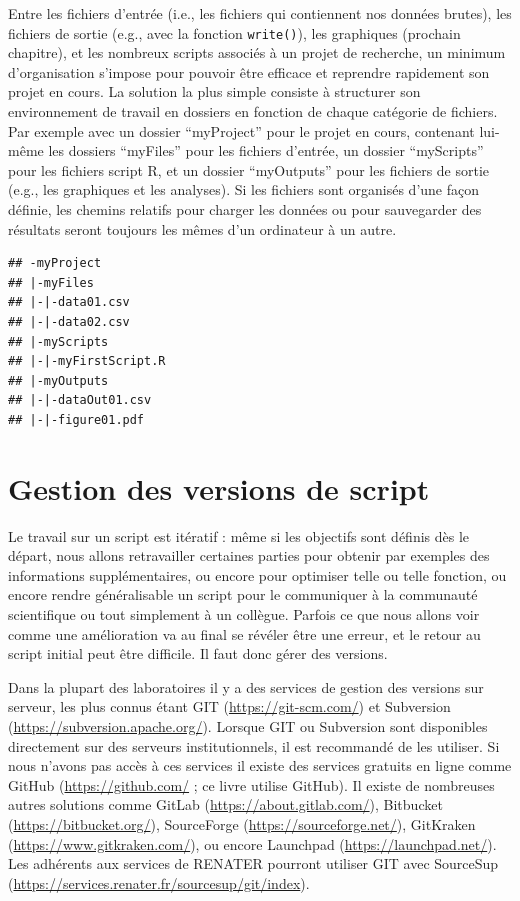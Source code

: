 \documentclass[twoside,symmetric]{book}
\begin{document}
Entre les fichiers d'entrée (i.e., les fichiers qui contiennent nos données brutes), les fichiers de sortie (e.g., avec la fonction \texttt{write()}), les graphiques (prochain chapitre), et les nombreux scripts associés à un projet de recherche, un minimum d'organisation s'impose pour pouvoir être efficace et reprendre rapidement son projet en cours. La solution la plus simple consiste à structurer son environnement de travail en dossiers en fonction de chaque catégorie de fichiers. Par exemple avec un dossier ``myProject'' pour le projet en cours, contenant lui-même les dossiers ``myFiles'' pour les fichiers d'entrée, un dossier ``myScripts'' pour les fichiers script R, et un dossier ``myOutputs'' pour les fichiers de sortie (e.g., les graphiques et les analyses). Si les fichiers sont organisés d'une façon définie, les chemins relatifs pour charger les données ou pour sauvegarder des résultats seront toujours les mêmes d'un ordinateur à un autre.

\begin{verbatim}
## -myProject
## |-myFiles
## |-|-data01.csv
## |-|-data02.csv
## |-myScripts
## |-|-myFirstScript.R
## |-myOutputs
## |-|-dataOut01.csv
## |-|-figure01.pdf
\end{verbatim}

\hypertarget{gestion-des-versions-de-script}{%
\section{Gestion des versions de script}\label{gestion-des-versions-de-script}}

Le travail sur un script est itératif : même si les objectifs sont définis dès le départ, nous allons retravailler certaines parties pour obtenir par exemples des informations supplémentaires, ou encore pour optimiser telle ou telle fonction, ou encore rendre généralisable un script pour le communiquer à la communauté scientifique ou tout simplement à un collègue. Parfois ce que nous allons voir comme une amélioration va au final se révéler être une erreur, et le retour au script initial peut être difficile. Il faut donc gérer des versions.

Dans la plupart des laboratoires il y a des services de gestion des versions sur serveur, les plus connus étant GIT (\url{https://git-scm.com/}) et Subversion (\url{https://subversion.apache.org/}). Lorsque GIT ou Subversion sont disponibles directement sur des serveurs institutionnels, il est recommandé de les utiliser. Si nous n'avons pas accès à ces services il existe des services gratuits en ligne comme GitHub (\url{https://github.com/} ; ce livre utilise GitHub). Il existe de nombreuses autres solutions comme GitLab (\url{https://about.gitlab.com/}), Bitbucket (\url{https://bitbucket.org/}), SourceForge (\url{https://sourceforge.net/}), GitKraken (\url{https://www.gitkraken.com/}), ou encore Launchpad (\url{https://launchpad.net/}). Les adhérents aux services de RENATER pourront utiliser GIT avec SourceSup (\url{https://services.renater.fr/sourcesup/git/index}).
\end{document}
